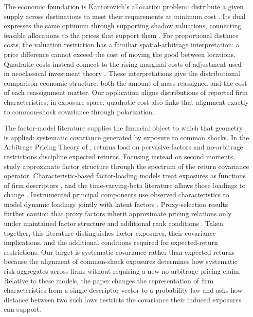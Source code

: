 The economic foundation is Kantorovich's allocation problem: distribute a
given supply across destinations to meet their requirements at minimum cost
\citep{kantorovich_translocation_1958}.
Its dual expresses the same optimum through supporting shadow valuations,
connecting feasible allocations to the prices that support them
\citep{panaretos_invitation_2020}.
For proportional distance costs, the valuation restriction has a familiar
spatial-arbitrage interpretation: a price difference cannot exceed the cost
of moving the good between locations.
Quadratic costs instead connect to the rising marginal costs of adjustment
used in neoclassical investment theory \citep{hayashi_marginal_q_1982}.
These interpretations give the distributional comparison economic structure:
both the amount of mass reassigned and the cost of each reassignment matter.
Our application aligns distributions of reported firm characteristics;
in exposure space, quadratic cost also links that alignment exactly to
common-shock covariance through polarization.

The factor-model literature supplies the financial object to which that
geometry is applied: systematic covariance generated by exposure to common shocks.
In the Arbitrage Pricing Theory of \citet{ross_arbitrage_1976}, returns load
on pervasive factors and no-arbitrage restrictions discipline expected returns.
Focusing instead on second moments, \citet{chamberlain_rothschild_1983} study
approximate factor structure through the spectrum of the return covariance operator.
Characteristic-based factor-loading models treat exposures as functions of
firm descriptors
\citep{rosenberg1974extra,connor2007semiparametric,connor2012efficient}, and
the time-varying-beta literature allows those loadings to change
\citep{ghysels_stable_1998}.
Instrumented principal components use observed characteristics to model
dynamic loadings jointly with latent factors
\citep{kelly_characteristics_2019}.
Proxy-selection results further caution that proxy factors inherit
approximate pricing relations only under maintained factor structure and
additional rank conditions
\citep{reisman1992reference,shanken1992current,middleton2000deriving}.
Taken together, this literature distinguishes factor exposures, their
covariance implications, and the additional conditions required for
expected-return restrictions.
Our target is systematic covariance rather than expected returns because the
alignment of common-shock exposures determines how systematic risk aggregates
across firms without requiring a new no-arbitrage pricing claim.
Relative to these models, the paper changes the representation of firm
characteristics from a single descriptor vector to a probability law and asks
how distance between two such laws restricts the covariance their induced
exposures can support.

